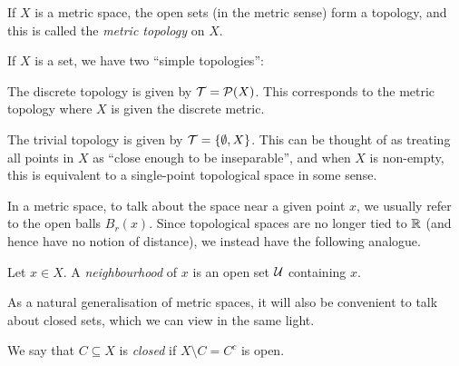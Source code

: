 \documentclass[11pt]{article}
\begin{document}
\begin{example}
    \begin{enum2}
        \item If $X$ is a metric space, the open sets (in the metric sense) form a topology, and this is called the \emph{metric topology} on $X$.
        \item If $X$ is a set, we have two ``simple topologies'':
        \begin{enum2}
            \item The discrete topology is given by $\mathcal{T} = \mathcal{P}(X)$. This corresponds to the metric topology where $X$ is given the discrete metric.
            \item The trivial topology is given by $\mathcal{T} = \left\{  \emptyset, X  \right\}$. This can be thought of as treating all points in $X$ as ``close enough to be inseparable'', and when $X$ is non-empty, this is equivalent to a single-point topological space in some sense.
        \end{enum2}
    \end{enum2}
\end{example}

In a metric space, to talk about the space near a given point $x$, we usually refer to the open balls $B_r(x)$. Since topological spaces are no longer tied to $\mathbb{R}$ (and hence have no notion of distance), we instead have the following analogue.
\begin{definition}[Neighbourhood]
    Let $x \in X$. A \emph{neighbourhood} of $x$ is an open set $\mathcal{U}$ containing $x$.
\end{definition}
As a natural generalisation of metric spaces, it will also be convenient to talk about closed sets, which we can view in the same light.
\begin{definition}
    We say that $C \subseteq X$ is \emph{closed} if $X \setminus C = C^c$ is open.
\end{definition}
\end{document}
